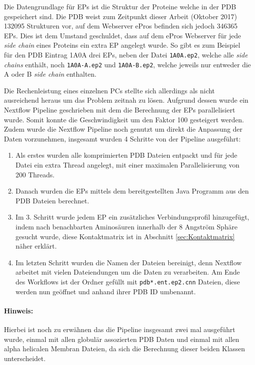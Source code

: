 Die Datengrundlage für \ac{EP}s ist die Struktur der Proteine welche in der \ac{PDB} gespeichert sind. Die \ac{PDB} weist zum Zeitpunkt dieser Arbeit (Oktober 2017) 132095 Strukturen vor, auf dem Webserver ePros befinden sich jedoch 346365 \ac{EP}s. Dies ist dem Umstand geschuldet, dass auf dem ePros Webserver für jede \emph{side chain} eines Proteins ein extra \ac{EP} angelegt wurde. So gibt es zum Beispiel für den \ac{PDB} Eintrag 1A0A drei \ac{EP}s, neben der Datei \texttt{1A0A.ep2}, welche alle \emph{side chains} enthält, noch \texttt{1A0A-A.ep2} und \texttt{1A0A-B.ep2}, welche jeweils nur entweder die A oder B \emph{side chain} enthalten.

Die Rechenleistung eines einzelnen PCs stellte sich allerdings als nicht ausreichend heraus um das Problem zeitnah zu lösen. Aufgrund dessen wurde ein Nextflow Pipeline geschrieben mit dem die Berechnung der \ac{EP}s  parallelisiert wurde. Somit konnte die Geschwindigkeit um den Faktor 100 gesteigert werden. Zudem wurde die Nextflow Pipeline noch genutzt um direkt die Anpassung der Daten vorzunehmen, insgesamt wurden 4 Schritte von der Pipeline ausgeführt:

\begin{enumerate}
    \item
        Als erstes wurden alle komprimierten \ac{PDB} Dateien entpackt und für jede Datei ein extra Thread angelegt, mit einer maximalen Parallelisierung von 200 Threads.
    \item 
        Danach wurden die \ac{EP}s  mittels dem bereitgestellten Java Programm aus den \ac{PDB} Dateien berechnet.
    \item
        Im 3. Schritt wurde jedem \ac{EP} ein zusätzliches Verbindungsprofil hinzugefügt, indem nach benachbarten Aminosäuren innerhalb der 8 Angström Sphäre gesucht wurde, diese Kontaktmatrix ist in Abschnitt \ref{sec:Kontaktmatrix} näher erklärt.
    \item
        Im letzten Schritt wurden die Namen der Dateien bereinigt, denn Nextflow arbeitet mit vielen Dateiendungen um die Daten zu verarbeiten. Am Ende des Workflows ist der Ordner gefüllt mit \texttt{pdb*.\-ent.\-ep2.\-cnn} Dateien, diese werden nun geöffnet und anhand ihrer \ac{PDB} ID umbenannt.
\end{enumerate}

\paragraph{Hinweis:} Hierbei ist noch zu erwähnen das die Pipeline insgesamt zwei mal ausgeführt wurde, einmal mit allen globulär assozierten \ac{PDB} Daten und einmal mit allen alpha helicalen Membran Dateien, da sich die Berechnung dieser beiden Klassen unterscheidet.

